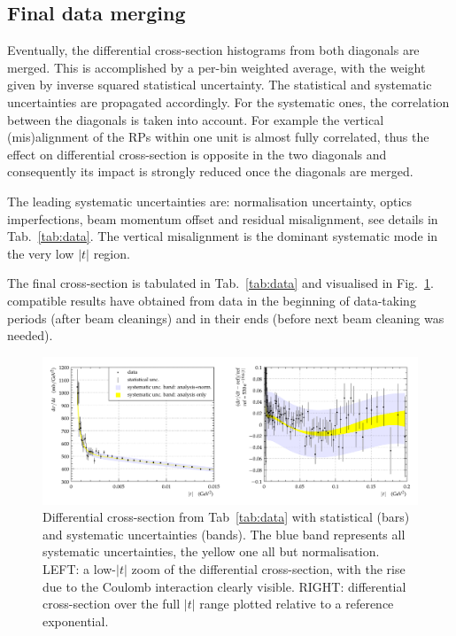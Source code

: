 \subsection{Final data merging}

Eventually, the differential cross-section histograms from both diagonals are merged. This is accomplished by a per-bin weighted average, with the weight given by inverse squared statistical uncertainty. The statistical and systematic uncertainties are propagated accordingly. For the systematic ones, the correlation between the diagonals is taken into account. For example the vertical (mis)alignment of the RPs within one unit is almost fully correlated, thus the effect on differential cross-section is opposite in the two diagonals and consequently its impact is strongly reduced once the diagonals are merged.

The leading systematic uncertainties are: normalisation uncertainty, optics imperfections, beam momentum offset and residual misalignment, see details in Tab.~\ref{tab:data}. The vertical misalignment is the dominant systematic mode in the very low $|t|$ region.

The final cross-section is tabulated in Tab.~\ref{tab:data} and visualised in Fig.~\ref{fig:dsdt}.  compatible results have obtained from data in the beginning of data-taking periods (after beam cleanings) and in their ends (before next beam cleaning was needed).





\begin{figure}
\vskip-5mm
\begin{center}
\includegraphics[width=18cm]{fig/t_dist_tabulation.pdf}
\vskip-3mm
\caption{%
Differential cross-section from Tab~\ref{tab:data} with statistical (bars) and systematic uncertainties (bands). The blue band represents all systematic uncertainties, the yellow one all but normalisation. LEFT: a low-$|t|$ zoom of the differential cross-section, with the rise due to the Coulomb interaction clearly visible. RIGHT: differential cross-section over the full $|t|$ range plotted relative to a reference exponential.
}
\label{fig:dsdt}
\end{center}
\end{figure}


